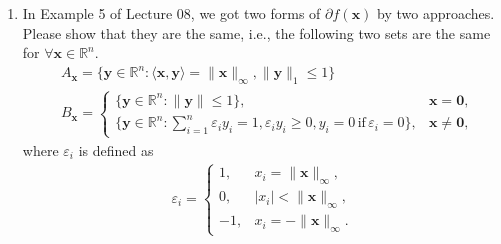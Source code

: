 \documentclass[11pt,letter,notitlepage]{article}
\begin{document}
\begin{exercise}[Subdifferentials]
\begin{enumerate}
\begin{enumerate}
        \end{enumerate}
        \item In Example 5 of Lecture 08, we got two forms of $\partial f(\textbf{x})$ by two approaches. Please show that they are the same, i.e., the following two sets are the same for $\forall \textbf{x}\in\mathbb{R}^n$.
        \begin{align*}
            &A_\textbf{x}=\{\textbf{y}\in\mathbb{R}^n:\langle\textbf{x},\textbf{y}\rangle=\|\textbf{x}\|_{\infty},\|\textbf{y}\|_1\le 1\}\\
            &B_\textbf{x}=\begin{cases}
                \{\textbf{y}\in\mathbb{R}^n:\|\textbf{y}\|\le1\},&\textbf{x}=\textbf{0},\\
                \{\textbf{y}\in\mathbb{R}^n:\sum_{i=1}^n \varepsilon_i y_i=1,\varepsilon_iy_i\ge 0,y_i=0\,\text{if}\,\varepsilon_i=0\},&\textbf{x}\neq \textbf{0},
            \end{cases}
        \end{align*}
        where $\varepsilon_i$ is defined as
        \begin{align*}
            \varepsilon_i=\begin{cases}
                1,&x_i=\|\textbf{x}\|_\infty,\\
                0,&|x_i|<\|\textbf{x}\|_\infty,\\
                -1,&x_i=-\|\mathbf{x}\|_\infty.
            \end{cases}
        \end{align*}
    \end{enumerate}
\end{exercise}
\begin{solution}

\end{solution}
\end{document}
